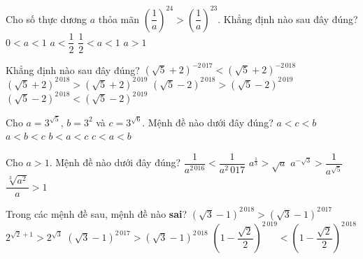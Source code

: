 \begin{ex}%
	Cho số thực dương $a$ thỏa mãn $\left( \dfrac{1}{a}\right)^{24}>\left( \dfrac{1}{a}\right)^{23} $. Khẳng  định nào sau đây đúng?
	\choice 
		{\True  $0<a<1$}
		{$a<\dfrac{1}{2}$} 
		 {$\dfrac{1}{2}<a<1$}
		 {$a>1$}
\end{ex}

\begin{ex}%
	Khẳng định nào sau đây đúng? 
	\choice 
		 {$\left(\sqrt{5}+2\right)^{-2\,017}<\left(\sqrt{5}+2\right)^{-2\,018}$}
		{$\left(\sqrt{5}+2\right)^{2\,018}>\left(\sqrt{5}+2\right)^{2\,019}$} 
		{\True $\left(\sqrt{5}-2\right)^{2\,018}>\left(\sqrt{5}-2\right)^{2\,019}$} 
		{$\left(\sqrt{5}-2\right)^{2\,018}<\left(\sqrt{5}-2\right)^{2\,019}$} 
\end{ex}

\begin{ex}%
	Cho $a=3^{\sqrt{5}}$, $b=3^2$ và $c=3^{\sqrt{6}}$. Mệnh đề nào dưới đây  đúng?
	\choice 
		 {$a<c<b$}
		 {$a<b<c$}
		{\True $b<a<c$} 
		{$c<a<b$} 
\end{ex}

\begin{ex}%
	Cho $a>1$. Mệnh đề nào dưới đây đúng? 
	\choice 
		{$\dfrac{1}{a^{2\,016}}<\dfrac{1}{a^2\,017}$} 
		{$a^{\tfrac{1}{3}}>\sqrt{a}$} 
		{\True $a^{-\sqrt{3}}>\dfrac{1}{a^{\sqrt{5}}}$} 
		{$\dfrac{\sqrt[3]{a^2}}{a}>1$} 
\end{ex}

\begin{ex}%
	Trong các mệnh đề sau, mệnh  đề nào \textbf{sai}?
	\choice 
		{\True  $\left(\sqrt{3}-1\right)^{2\,018}>\left(\sqrt{3}-1\right)^{2\,017}$}
		 {$2^{\sqrt{2}+1}>2^{\sqrt{3}}$}
		 {$\left(\sqrt{3}-1\right)^{2\,017}>\left(\sqrt{3}-1\right)^{2\,018}$}
		{$\left(1-\dfrac{\sqrt{2}}{2}\right)^{2\,019}<\left(1-\dfrac{\sqrt{2}}{2}\right)^{2\,018}$} 
\end{ex}

